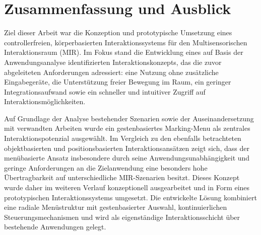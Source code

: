 

\clearpage
\section{Zusammenfassung und Ausblick}
Ziel dieser Arbeit war die Konzeption und prototypische Umsetzung eines controllerfreien, körper\-basierten Interaktionssystems für den Multisensorischen Interaktionsraum (MIR). Im Fokus stand die Entwicklung eines auf Basis der Anwendungsanalyse identifizierten Interaktionskonzepts, das die zuvor abgeleiteten Anforderungen adressiert: eine Nutzung ohne zusätzliche Eingabegeräte, die Unterstützung freier Bewegung im Raum, ein geringer Integrationsaufwand sowie ein schneller und intuitiver Zugriff auf Interaktionsmöglichkeiten.

Auf Grundlage der Analyse bestehender Szenarien sowie der Auseinandersetzung mit verwandten Arbeiten wurde ein gestenbasiertes Marking-Menu als zentrales Interaktionspotenzial ausgewählt. Im Vergleich zu den ebenfalls betrachteten objektbasierten und positionsbasierten Interaktionsansätzen zeigt sich, dass der menübasierte Ansatz insbesondere durch seine Anwendungs\-unabhängig\-keit und geringe Anforderungen an die Zielanwendung eine besonders hohe Übertragbarkeit auf unterschiedliche MIR-Szenarien besitzt. Dieses Konzept wurde daher im weiteren Verlauf konzeptionell ausgearbeitet und in Form eines prototypischen Interaktionssystems umgesetzt. Die entwickelte Lösung kombiniert eine radiale Menüstruktur mit gestenbasierter Auswahl, kontinuierlichen Steuerungsmechanismen und wird als eigenständige Interaktionsschicht über bestehende Anwendungen gelegt.

